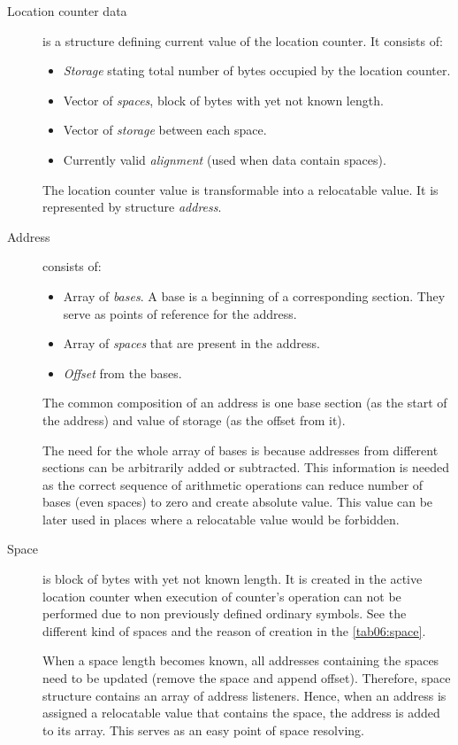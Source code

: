 \begin{description}
	\item[Location counter data] is a structure defining current value of the location counter. It consists of:
	\begin{itemize}
		\item \emph{Storage} stating total number of bytes occupied by the location counter.
		\item Vector of \emph{spaces}, block of bytes with yet not known length.
		\item Vector of \emph{storage} between each space.
		\item Currently valid \emph{alignment} (used when data contain spaces).
	\end{itemize}
	
	The location counter value is transformable into a relocatable value. It is represented by structure \emph{address}.
	
	\item[Address] consists of:
	\begin{itemize}
		\item Array of \emph{bases}. A base is a beginning of a corresponding section. They serve as points of reference for the address.
		\item Array of \emph{spaces} that are present in the address. 
		\item \emph{Offset} from the bases.
	\end{itemize}
	
	The common composition of an address is one base section (as the start of the address) and value of storage (as the offset from it).
	
	The need for the whole array of bases is because addresses from different sections can be arbitrarily added or subtracted. This information is needed as the correct sequence of arithmetic operations can reduce number of bases (even spaces) to zero and create absolute value. This value can be later used in places where a relocatable value would be forbidden.
	
	\item[Space] is block of bytes with yet not known length. It is created in the active location counter when execution of counter's operation can not be performed due to non previously defined ordinary symbols. See the different kind of spaces and the reason of creation in  the \cref{tab06:space}.
	
	When a space length becomes known, all addresses containing the spaces need to be updated (remove the space and append offset). Therefore, space structure contains an array of address listeners. Hence, when an address is assigned a relocatable value that contains the space, the address is added to its array. This serves as an easy point of space resolving.
\end{description}



